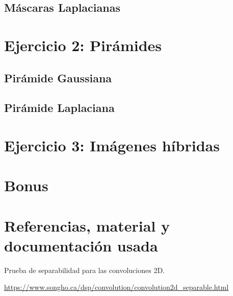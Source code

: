 \documentclass[12pt, spanish]{article}
\begin{document}
\begin{figure}[H]
  	\label{fig:ej1c5}
\end{figure}


\subsection{Máscaras Laplacianas}



\section{Ejercicio 2: Pirámides}

\subsection{Pirámide Gaussiana}

\subsection{Pirámide Laplaciana}



\section{Ejercicio 3: Imágenes híbridas}



\section{Bonus}

\newpage

\section{Referencias, material y documentación usada}


\begin{thebibliography}{9}

	Prueba de separabilidad para las convoluciones 2D.

	\url{https://www.songho.ca/dsp/convolution/convolution2d_separable.html}

\end{thebibliography}
\end{document}
